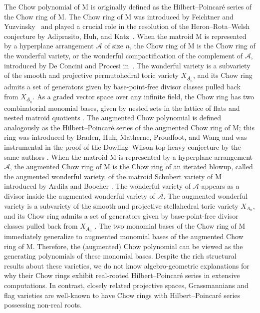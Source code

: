 \documentclass[11pt,a4paper]{amsart}
\theoremstyle{results}
\theoremstyle{definitions}
\def\calA{\mathcal{A}}
\newcommand{\M}{\mathrm{M}}
\begin{document}
The Chow polynomial of $\M$ is originally defined as the Hilbert--Poincar\'e series of the Chow ring of $\M$. The Chow ring of $\M$ was introduced by Feichtner and Yuzvinsky~\cite{feichtner2004chow} and played a crucial role in the resolution of the Heron--Rota--Welsh conjecture by Adiprasito, Huh, and Katz~\cite{adiprasito2018hodge}. When the matroid $\M$ is represented by a  hyperplane arrangement $\calA$ of size $n$, the Chow ring of $\M$ is the Chow ring of the wonderful variety, or the wonderful compactification of the complement of $\calA$, introduced by De Concini and Procesi in~\cite{de1995wonderful}. The wonderful variety is a subvariety of the smooth and projective permutohedral toric variety $X_{\underline{A}_n}$, and its Chow ring admits a set of generators given by base-point-free divisor classes pulled back from $X_{\underline{A}_n}$. As a graded vector space over any infinite field, the Chow ring has two combinatorial monomial bases, given by nested sets in the lattice of flats \cite{feichtner2004chow} and  nested matroid quotients \cite{backman2023simplicial}. The augmented Chow polynomial is defined analogously as the Hilbert--Poincar\'e series of the augmented Chow ring of $\M$; this ring was introduced by Braden, Huh, Matherne, Proudfoot, and Wang \cite{BRADEN2022108646} and was instrumental in the proof of the Dowling--Wilson top-heavy conjecture by the same authors \cite{braden2020singular}. When the matroid $\M$ is represented by a hyperplane arrangement $\calA$, the augmented Chow ring of $\M$ is the Chow ring of an iterated blowup, called the augmented wonderful variety, of the matroid Schubert variety of $\M$ introduced by Ardila and Boocher \cite{ardila2016closure}. The wonderful variety of $\calA$ appears as a divisor inside the augmented wonderful variety of $\calA$. The augmented wonderful variety is a subvariety of the smooth and projective stellahedral toric variety $X_{A_n}$, and its Chow ring admits a set of generators given by base-point-free divisor classes pulled back from $X_{A_n}$ \cite{eur2022stellahedral}. The two monomial bases of the Chow ring of $\M$ immediately generalize to augmented monomial bases of the augmented Chow ring of $\M$. Therefore, the (augmented) Chow polynomial can be viewed as the generating polynomials of these monomial bases. Despite the rich structural results about these varieties, we do not know algebro-geometric explanations for why their Chow rings exhibit real-rooted Hilbert--Poincaré series in extensive computations. In contrast, closely related projective spaces, Grassmannians and flag varieties are well-known to have Chow rings with Hilbert--Poincaré series possessing non-real roots. 
\end{document}
